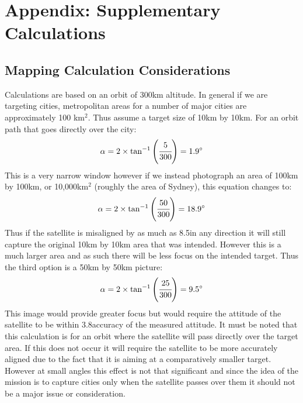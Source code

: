 \section{Appendix: Supplementary Calculations}

\subsection{Mapping Calculation Considerations} \label{app:mapping}
Calculations are based on an orbit of 300km altitude. In general if we are targeting cities, metropolitan areas for a number of major cities are approximately 100 km$^2$.  Thus assume a target size of 10km by 10km.  For an orbit path that goes directly over the city:
\[
\alpha = 2\times \tan^{-1}\left(\cfrac{5}{300}\right) = 1.9\deg
\]
\noindent
This is a very narrow window however if we instead photograph an area of 100km by 100km, or 10,000km$^2$ (roughly the area of Sydney), this equation changes to:
\[
\alpha = 2\times \tan^{-1}\left(\cfrac{50}{300}\right) = 18.9\deg
\]
\noindent
Thus if the satellite is misaligned by as much as 8.5\deg in any direction it will still capture the original 10km by 10km area that was intended.  However this is a much larger area and as such there will be less focus on the intended target.  Thus the third option is a 50km by 50km picture:
\[
\alpha = 2\times \tan^{-1}\left(\cfrac{25}{300}\right) = 9.5\deg
\]
\noindent
This image would provide greater focus but would require the attitude of the satellite to be within 3.8\deg accuracy of the measured attitude. It must be noted that this calculation is for an orbit where the satellite will pass directly over the target area.  If this does not occur it will require the satellite to be more accurately aligned due to the fact that it is aiming at a comparatively smaller target.  However at small angles this effect is not that significant and since the idea of the mission is to capture cities only when the satellite passes over them it should not be a major issue or consideration.

